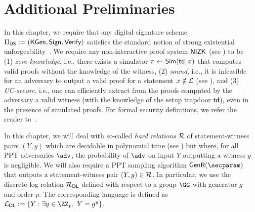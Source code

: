 \section{Additional Preliminaries}

In this chapter, we require that any digital signature scheme $\Pi_{\mathsf{DS}} := ({\mathsf{KGen}}, {\mathsf{Sign}},\allowbreak {\mathsf{Verify}})$ satisfies the standard notion of strong existential unforgeability~\cite{GolMicRiv88}. We require any non-interactive proof system $\mathsf{NIZK}$ (see ) to be (1) \emph{zero-knowledge}, i.e., there exists a simulator $\pi \gets \mathsf{Sim}(\mathsf{td}, x)$ that computes valid proofs without the knowledge of the witness, (2) \emph{sound}, i.e., it is infeasible for an adversary to output a valid proof for a statement $x \notin \mathcal{L}$ (see ), and (3) \emph{UC-secure}, i.e., one can efficiently extract from the proofs computed by the adversary a valid witness (with the knowledge of the setup trapdoor $\mathsf{td}$), even in the presence of simulated proofs. For formal security definitions, we refer the reader to~\cite{C:DeSMicPer87,AC:CamKreSho11}.

In this chapter, we will deal with so-called \emph{hard relations} $\mathcal{R}$ of statement-witness pairs $(Y,y)$ which are decidable in polynomial time (see ) but where, for all PPT adversaries $\adv$, the probability of $\adv$ on input $Y$ outputting a witness $y$ is negligible. We will also require a PPT sampling algorithm $\genr(\secparam)$ that outputs a statement-witness pair $(Y, y) \in \mathcal{R}$.
In particular, we use the discrete log relation $\mathcal{R}_{\mathsf{DL}}$ defined with respect to a group $\GG$ with generator $g$ and order $p$. The corresponding language is defined as $\Lang_\DL := \{ Y : \exists y \in \ZZ_p,\ Y = g^y \}$.

